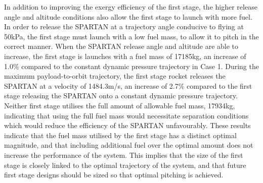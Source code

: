  In addition to improving the exergy efficiency of the first stage, the higher release angle and altitude conditions also allow the first stage to launch with more fuel. In order to release the SPARTAN at a trajectory angle conducive to flying at 50kPa, the first stage must launch with a low fuel mass, to allow it to pitch in the correct manner. When the SPARTAN release angle and altitude are able to increase, the first stage is launches with a fuel mass of 17185kg, an increase of 1.0\% compared to the constant dynamic pressure trajectory in Case 1. During the maximum payload-to-orbit trajectory, the first stage rocket releases the SPARTAN at a velocity of 1484.3m/s, an increase of 2.7\% compared to the first stage releasing the SPARTAN onto a constant dynamic pressure trajectory. Neither first stage utilises the full amount of allowable fuel mass, 17934kg, indicating that using the full fuel mass would necessitate separation conditions which would reduce the efficiency of the SPARTAN unfavourably. 
These results indicate that the fuel mass utilised by the first stage has a distinct optimal magnitude, and that including additional fuel over the optimal amount does not increase the performance of the system. This implies that the size of the first stage is closely linked to the optimal trajectory of the system, and that future first stage designs should be sized so that optimal pitching is achieved. 


